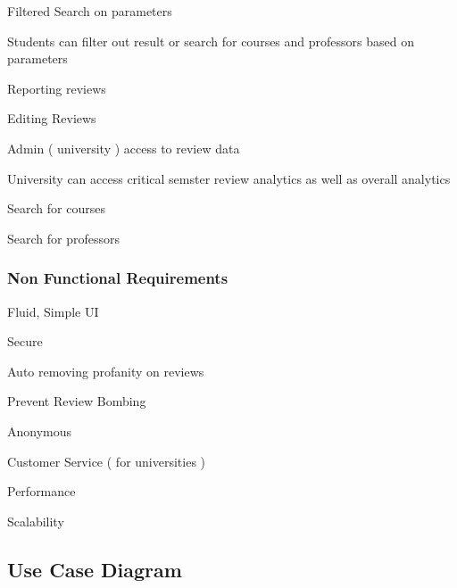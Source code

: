 \documentclass{article}
\begin{document}
	\quad Filtered Search on parameters 
	\vspace{-0.2cm}

	\qquad \scriptsize Students can filter out result or search for courses and professors based on parameters \normalsize

	\quad Reporting reviews

	\quad Editing Reviews

	\quad Admin ( university ) access to review data 
	\vspace{-0.2cm} 

	\qquad \scriptsize University can access critical semster review analytics as well as overall analytics \normalsize

	\quad Search for courses 

	\quad Search for professors 



\subsubsection{Non Functional Requirements} 

	\quad Fluid, Simple UI

	\quad Secure

	\quad Auto removing profanity on reviews

	\quad Prevent Review Bombing

	\quad Anonymous

	\quad Customer Service ( for universities )

	\quad Performance

	\quad Scalability

\subsection{Use Case Diagram} 
\end{document}
